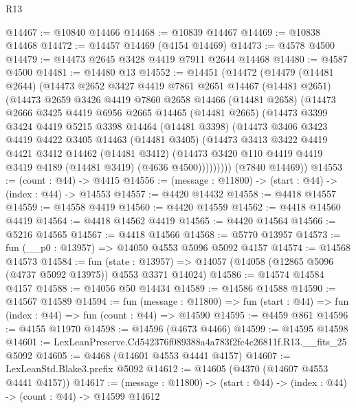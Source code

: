 \begin{lexlean}{R13}
\begin{coremodule}
@14467 := @10840 @14466
@14468 := @10839 @14467
@14469 := @10838 @14468
@14472 := @14457 @14469 (@4154 @14469)
@14473 := @4578 @4500
@14479 := @14473 @2645 @3428 @4419 @7911 @2644 @14468
@14480 := @4587 @4500
@14481 := @14480 @13
@14552 := @14451
    (@14472
      (@14479
        (@14481 @2644)
        (@14473
          @2652
          @3427
          @4419
          @7861
          @2651
          @14467
          (@14481 @2651)
          (@14473
            @2659
            @3426
            @4419
            @7860
            @2658
            @14466
            (@14481 @2658)
            (@14473
              @2666
              @3425
              @4419
              @6956
              @2665
              @14465
              (@14481 @2665)
              (@14473
                @3399
                @3424
                @4419
                @5215
                @3398
                @14464
                (@14481 @3398)
                (@14473
                  @3406
                  @3423
                  @4419
                  @4422
                  @3405
                  @14463
                  (@14481 @3405)
                  (@14473
                    @3413
                    @3422
                    @4419
                    @4421
                    @3412
                    @14462
                    (@14481 @3412)
                    (@14473 @3420 @110 @4419 @4419 @3419 @4189 (@14481 @3419) (@4636 @4500)))))))))
      (@7840 @14469))
@14553 := (count : @44) -> @4415
@14556 := (message : @11800) -> (start : @44) -> (index : @44) -> @14553
@14557 := @4420 @14432
@14558 := @4418 @14557
@14559 := @14558 @4419
@14560 := @4420 @14559
@14562 := @4418 @14560 @4419
@14564 := @4418 @14562 @4419
@14565 := @4420 @14564
@14566 := @5216 @14565
@14567 := @4418 @14566
@14568 := @5770 @13957
@14573 := fun (__p0 : @13957) => @14050 @4553 @5096 @5092 @4157
@14574 := @14568 @14573
@14584 := fun (state : @13957) =>
  @14057 (@14058 (@12865 @5096 (@4737 @5092 @13975)) @4553 @3371 @14024)
@14586 := @14574 @14584 @4157
@14588 := @14056 @50 @14434
@14589 := @14586 @14588
@14590 := @14567 @14589
@14594 := fun (message : @11800) =>
  fun (start : @44) => fun (index : @44) => fun (count : @44) => @14590
@14595 := @4459 @861
@14596 := @4155 @11970
@14598 := @14596 (@4673 @4466)
@14599 := @14595 @14598
@14601 := LexLeanPreserve.Cd542376f089388a4a783f2fc4c26811f.R13.__fits_25 @5092
@14605 := @4468 (@14601 @4553 @4441 @4157)
@14607 := LexLeanStd.Blake3.prefix @5092
@14612 := @14605 (@4370 (@14607 @4553 @4441 @4157))
@14617 := (message : @11800) -> (start : @44) -> (index : @44) -> (count : @44) -> @14599 @14612

\end{coremodule}
\end{lexlean}
